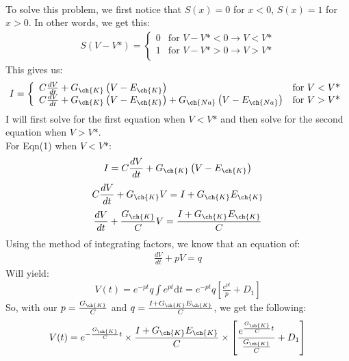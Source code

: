 \documentclass[11pt]{article}
\begin{document}
\begin{enumerate}[label=\arabic*.]
\begin{enumerate}[label=(\alph*)]
\\
To solve this problem, we first notice that $S(x) = 0$ for $x < 0$, $S(x) = 1$ for $x > 0$. In other words, we get this:
\begin{align*}
S (V - V\text{*}) = \left\{
\begin{array}{ll}
	0 & \text{for } V - V\text{*} < 0 \rightarrow V < V\text{*} \\
	1 & \text{for } V - V\text{*} > 0 \rightarrow V > V\text{*} \\
\end{array}
\right.
\end{align*}
This gives us:
\begin{align*}
I = \left\{
\begin{array}{ll}
	C \frac{dV} {dt} + G_{\ch{K}} \left(V - E_{\ch{K}}\right) & \text{for } V < V\text{*} \\
	C \frac{dV} {dt} + G_{\ch{K}} \left(V - E_{\ch{K}}\right) + G_{\ch{Na}} \left(V - E_{\ch{Na}}\right) & \text{for } V > V\text{*} \\
\end{array}
\right.
\end{align*}
I will first solve for the first equation when $V < V\text{*}$ and then solve for the second equation when $V > V\text{*}$.
\vspace*{1\baselineskip}
\\
For Eqn(1) when $V < V\text{*}$:
\begin{align*}
I = C \frac{dV} {dt} + G_{\ch{K}} \left(V - E_{\ch{K}}\right)
\end{align*}
\begin{align*}
C \frac{dV} {dt} + G_{\ch{K}} V = I + G_{\ch{K}} E_{\ch{K}}
\end{align*}
\begin{align*}
\frac{dV} {dt} + \frac{G_{\ch{K}}} {C} V = \frac{I + G_{\ch{K}} E_{\ch{K}}} {C}
\end{align*}
Using the method of integrating factors, we know that an equation of:
\begin{align*}
\frac{dV} {dt} + p V = q
\end{align*}
Will yield:
\begin{align*}
V(t) = e^{-pt} q \int e^{pt} \mathrm{d}t = e^{-pt} q \left[\frac{e^{pt}} {p} + D_1\right]
\end{align*}
So, with our $p = \frac{G_{\ch{K}}} {C}$ and $q = \frac{I + G_{\ch{K}} E_{\ch{K}}} {C}$, we get the following:
\begin{align*}
V(t) = e^{-\frac{G_{\ch{K}}} {C} t} \times \frac{I + G_{\ch{K}} E_{\ch{K}}} {C} \times \left[\frac{e^{\frac{G_{\ch{K}}} {C} t}} {\frac{G_{\ch{K}}} {C}} + D_1\right]

\end{align*}
\end{enumerate}
\end{enumerate}
\end{document}
